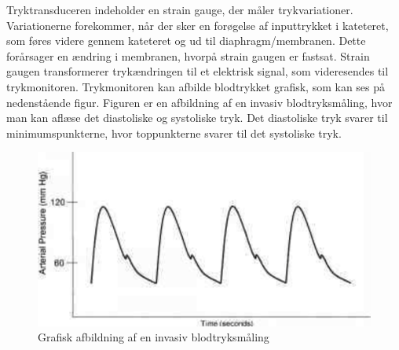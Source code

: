 Tryktransduceren indeholder en strain gauge, der måler trykvariationer. Variationerne forekommer, når der sker en forøgelse af inputtrykket i kateteret, som føres videre gennem kateteret og ud til diaphragm/membranen. Dette forårsager en ændring i membranen, hvorpå strain gaugen er fastsat. Strain gaugen transformerer trykændringen til et elektrisk signal, som videresendes til trykmonitoren. Trykmonitoren kan afbilde blodtrykket grafisk, som kan ses på nedenstående figur. Figuren er en afbildning af en invasiv blodtryksmåling, hvor man kan aflæse det diastoliske og systoliske tryk. Det diastoliske tryk svarer til minimumspunkterne, hvor toppunkterne svarer til det systoliske tryk. 
\begin{figure}[H]
	\centering
	\includegraphics[width=1\textwidth]{Figurer/Snip20151207_51}
	\caption{Grafisk afbildning af en invasiv blodtryksmåling}
\end{figure}
